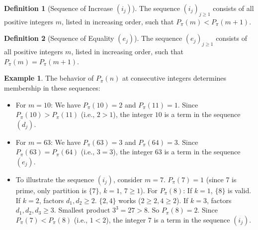 \documentclass[]{article}
\theoremstyle{plain}%
\theoremstyle{definition}
\newtheorem{defn}{Definition}[section]
\newtheorem{exmp}{Example}[section]
\theoremstyle{remark}
\begin{document}
\begin{defn}[Sequence of Increase $(i_j)$]
	The sequence $(i_j)_{j \ge 1}$ consists of all positive integers $m$, listed in increasing order, such that $P_{\pi}(m) < P_{\pi}(m+1)$.
\end{defn}

\begin{defn}[Sequence of Equality $(e_j)$]
	The sequence $(e_j)_{j \ge 1}$ consists of all positive integers $m$, listed in increasing order, such that $P_{\pi}(m) = P_{\pi}(m+1)$.
\end{defn}

\begin{exmp}
	The behavior of $P_{\pi}(n)$ at consecutive integers determines membership in these sequences:
	\begin{itemize}
		\item For $m=10$: We have $P_{\pi}(10)=2$ and $P_{\pi}(11)=1$. Since $P_{\pi}(10) > P_{\pi}(11)$ (i.e., $2 > 1$), the integer $10$ is a term in the sequence $(d_j)$.
		
		\item For $m=63$: We have $P_{\pi}(63)=3$ and $P_{\pi}(64)=3$. Since $P_{\pi}(63) = P_{\pi}(64)$ (i.e., $3 = 3$), the integer $63$ is a term in the sequence $(e_j)$.
		
		\item To illustrate the sequence $(i_j)$, consider $m=7$.
		$P_{\pi}(7)=1$ (since 7 is prime, only partition is $\{7\}$, $k=1$, $7 \ge 1$).
		For $P_{\pi}(8)$: If $k=1$, $\{8\}$ is valid. If $k=2$, factors $d_1, d_2 \ge 2$. $\{2,4\}$ works ($2\ge 2, 4\ge 2$). If $k=3$, factors $d_1,d_2,d_3 \ge 3$. Smallest product $3^3=27 > 8$. So $P_{\pi}(8)=2$.
		Since $P_{\pi}(7) < P_{\pi}(8)$ (i.e., $1 < 2$), the integer $7$ is a term in the sequence $(i_j)$.
	\end{itemize}
\end{exmp}
\end{document}
